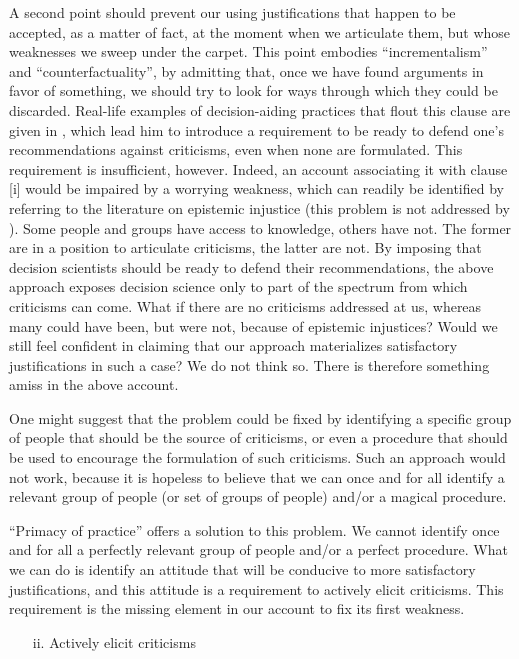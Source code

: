 \documentclass[preprint, french, english, 11pt, authoryear]{elsarticle}%
\begin{document}
A second point should prevent our using justifications that happen to be accepted, as a matter of fact, at the moment when we articulate them, but whose weaknesses we sweep under the carpet. This point embodies “incrementalism” and ``counterfactuality'', by admitting that, once we have found arguments in favor of something, we should try to look for ways through which they could be discarded. Real-life examples of decision-aiding practices that flout this clause are given in \cite{meinard_what_2017}, which lead him to introduce a requirement to be ready to defend one's recommendations against criticisms, even when none are formulated. This requirement is insufficient, however. Indeed, an account associating it with clause [i] would be impaired by a worrying weakness, which can readily be identified by referring to the literature on epistemic injustice \cite{fricker_epistemic_2007} (this problem is not addressed by \cite{meinard_what_2017}). Some people and groups have access to knowledge, others have not. The former are in a position to articulate criticisms, the latter are not. By imposing that decision scientists should be ready to defend their recommendations, the above approach exposes decision science only to part of the spectrum from which criticisms can come. What if there are no criticisms addressed at us, whereas many could have been, but were not, because of epistemic injustices? Would we still feel confident in claiming that our approach materializes satisfactory justifications in such a case? We do not think so. There is therefore something amiss in the above account.

One might suggest that the problem could be fixed by identifying a specific group of people that should be the source of criticisms, or even a procedure that should be used to encourage the formulation of such criticisms. Such an approach would not work, because it is hopeless to believe that we can once and for all identify a relevant group of people (or set of groups of people) and/or a magical procedure.

``Primacy of practice” offers a solution to this problem. We cannot identify once and for all a perfectly relevant group of people and/or a perfect procedure. What we can do is identify an attitude that will be conducive to more satisfactory justifications, and this attitude is a requirement to actively elicit criticisms. This requirement is the missing element in our account to fix its first weakness.

\begin{itemize}
\item[ii.]	Actively elicit criticisms
\end{itemize}
\end{document}
